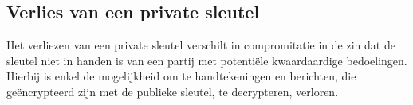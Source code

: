 \subsection{Verlies van een private sleutel}
\label{subsec:verlies-van-een-private-sleutel}
Het verliezen van een private sleutel verschilt in compromitatie in de zin dat
de sleutel niet in handen is van een partij met potentiële kwaardaardige
bedoelingen. Hierbij is enkel de mogelijkheid om te handtekeningen en berichten,
die geëncrypteerd zijn met de publieke sleutel, te decrypteren, verloren.
